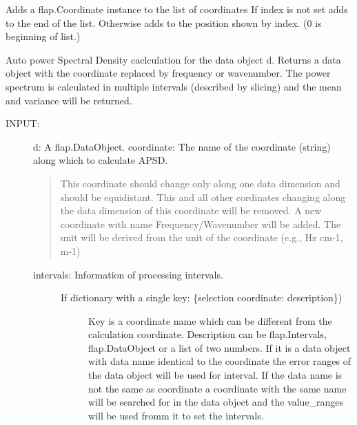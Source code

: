 \documentclass[letterpaper,10pt,english]{sphinxmanual}
\begin{document}
\begin{fulllineitems}
\begin{fulllineitems}
\label{\detokenize{data_object:flap.data_object.DataObject.add_coordinate_object}}
Adds a flap.Coordinate instance to the list of coordinates
If index is not set adds to the end of the list. Otherwise adds to the position
shown by index. (0 is beginning of list.)

\end{fulllineitems}


\begin{fulllineitems}
\label{\detokenize{data_object:flap.data_object.DataObject.apsd}}
Auto power Spectral Density caclculation for the data object d.
Returns a data object with the coordinate replaced by frequency or wavenumber.
The power spectrum is calculated in multiple intervals (described by slicing)
and the mean and variance will be returned.
\begin{description}
\item[{INPUT:}] \leavevmode
d: A flap.DataObject.
coordinate: The name of the coordinate (string) along which to calculate APSD.
\begin{quote}

This coordinate should change only along one data dimension and should be equidistant.
This and all other cordinates changing along the data dimension of
this coordinate will be removed. A new coordinate with name
Frequency/Wavenumber will be added. The unit will be
derived from the unit of the coordinate (e.g., Hz cm-1, m-1)
\end{quote}
\begin{description}
\item[{intervals: Information of processing intervals.}] \leavevmode\begin{description}
\item[{If dictionary with a single key: \{selection coordinate: description\})}] \leavevmode
Key is a coordinate name which can be different from the calculation
coordinate.
Description can be flap.Intervals, flap.DataObject or
a list of two numbers. If it is a data object with data name identical to
the coordinate the error ranges of the data object will be used for
interval. If the data name is not the same as coordinate a coordinate with the
same name will be searched for in the data object and the value\_ranges
will be used fromm it to set the intervals.


\end{description}
\end{description}
\end{description}
\end{fulllineitems}
\end{fulllineitems}
\end{document}
